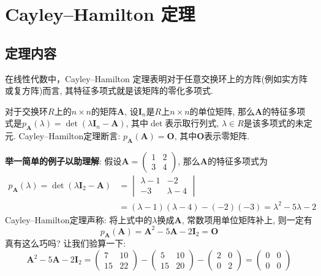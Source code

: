 \documentclass[main]{subfiles}
\begin{document}
\renewcommand{\filename}{16. Cayley–Hamilton 定理}%
\section{Cayley–Hamilton 定理}
\subsection{定理内容}
在线性代数中，Cayley–Hamilton 定理表明对于任意交换环上的方阵(例如实方阵或复方阵)而言, 其特征多项式就是该矩阵的零化多项式.

对于交换环$R$上的$n\times n$的矩阵$\boldsymbol{A}$, 设$\boldsymbol{I}_n$是$R$上$n\times n$的单位矩阵, 那么$\boldsymbol{A}$的特征多项式是$p_{\boldsymbol{A}}(\lambda)=\det(\lambda \boldsymbol{I}_n-\boldsymbol{A})$, 其中$\det$表示取行列式, $\lambda\in R$是该多项式的未定元. Cayley–Hamilton定理断言: $p_{\boldsymbol{A}}(\boldsymbol{A})=\boldsymbol{O}$, 其中$\boldsymbol{O}$表示零矩阵.

\textbf{举一简单的例子以助理解}: 假设$\boldsymbol{A}=\begin{pmatrix}
		1 & 2 \\
		3 & 4
	\end{pmatrix}$, 那么$\boldsymbol{A}$的特征多项式为
\[\begin{aligned}
		p_{\boldsymbol{A}}(\lambda)=\det(\lambda \boldsymbol{I}_2-\boldsymbol{A}) & =\begin{vmatrix}
			                                                                             \lambda-1 & -2        \\
			                                                                             -3        & \lambda-4
		                                                                             \end{vmatrix}                                  \\
		                                                                          & =(\lambda-1)(\lambda-4)-(-2)(-3)=\lambda^{2}-5\lambda-2
	\end{aligned}\]
Cayley–Hamilton定理声称: 将上式中的$\lambda$换成$\boldsymbol{A}$, 常数项用单位矩阵补上, 则一定有
\[p_{\boldsymbol{A}}(\boldsymbol{A})=\boldsymbol{A}^2-5\boldsymbol{A}-2\boldsymbol{I}_2=\boldsymbol{O}\]
真有这么巧吗? 让我们验算一下:
\[\boldsymbol{A}^2-5\boldsymbol{A}-2\boldsymbol{I}_2=\begin{pmatrix}
		7  & 10 \\
		15 & 22
	\end{pmatrix}
	-\begin{pmatrix}
		5  & 10 \\
		15 & 20
	\end{pmatrix}
	-\begin{pmatrix}
		2 & 0 \\
		0 & 2
	\end{pmatrix}
	=\begin{pmatrix}
		0 & 0 \\
		0 & 0
	\end{pmatrix}\]
\end{document}
